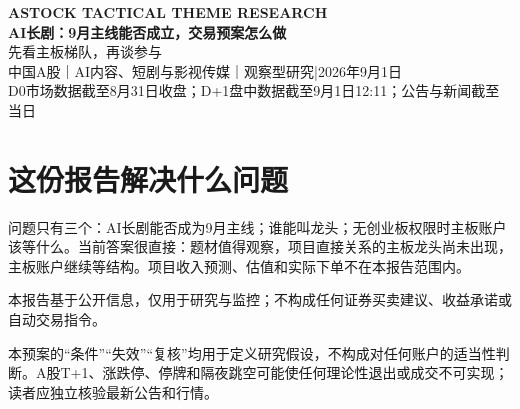 \documentclass[a4paper,11pt,fontset=none]{ctexart}
\newcommand{\reporttitle}{AI长剧：9月主线能否成立，交易预案怎么做}
\newcommand{\reportsubtitle}{先看主板梯队，再谈参与}
\newcommand{\reportkicker}{ASTOCK TACTICAL THEME RESEARCH}
\newcommand{\reportscope}{中国A股｜AI内容、短剧与影视传媒｜观察型研究}
\newcommand{\reportdate}{2026年9月1日}
\newcommand{\reportdatacutoff}{D0市场数据截至8月31日收盘；D+1盘中数据截至9月1日12:11；公告与新闻截至当日}
\newcommand{\reportdisclaimer}{本报告基于公开信息，仅用于研究与监控；不构成任何证券买卖建议、收益承诺或自动交易指令。}
\begin{document}
\begin{center}
{\sffamily\small\bfseries\color{steelgrey} \reportkicker}\\[3pt]
{\LARGE\bfseries\color{navy} \reporttitle}\\[5pt]
{\large\color{steelgrey} \reportsubtitle}\\[4pt]
{\small\color{mutedgrey} \reportscope\quad|\quad\reportdate\\\reportdatacutoff}
\end{center}
\vspace{0.5em}



\section{这份报告解决什么问题}
问题只有三个：AI长剧能否成为9月主线；谁能叫龙头；无创业板权限时主板账户该等什么。当前答案很直接：题材值得观察，项目直接关系的主板龙头尚未出现，主板账户继续等结构。项目收入预测、估值和实际下单不在本报告范围内。









\appendix


\vfill
\begin{disclosurebox}[研究与合规边界]
\small
\reportdisclaimer\par
本预案的“条件”“失效”“复核”均用于定义研究假设，不构成对任何账户的适当性判断。A股T+1、涨跌停、停牌和隔夜跳空可能使任何理论性退出或成交不可实现；读者应独立核验最新公告和行情。
\end{disclosurebox}
\end{document}
